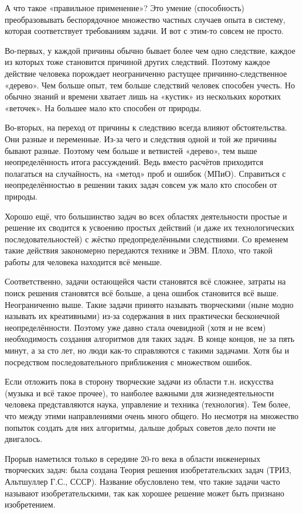 \documentclass[11pt,a4paper]{article}
\begin{document}
А что такое «правильное применение»? Это умение (способность) преобразовывать беспорядочное множество частных случаев опыта в систему, которая соответствует требованиям задачи. И вот с этим-то совсем не просто.

Во-первых, у каждой причины обычно бывает более чем одно следствие, каждое из которых тоже становится причиной других следствий. Поэтому каждое действие человека порождает неограниченно растущее причинно-следственное «дерево». Чем больше опыт, тем больше следствий человек способен учесть. Но обычно знаний и времени хватает лишь на «кустик» из нескольких коротких «веточек». На большее мало кто способен от природы.

Во-вторых, на переход от причины к следствию всегда влияют обстоятельства. Они разные и переменные. Из-за чего и следствия одной и той же причины бывают разные. Поэтому чем больше и ветвистей «дерево», тем выше неопределённость итога рассуждений. Ведь вместо расчётов приходится полагаться на случайность, на «метод» проб и ошибок (МПиО). Справиться с неопределённостью в решении таких задач совсем уж мало кто способен от природы.

Хорошо ещё, что большинство задач во всех областях деятельности простые и решение их сводится к усвоению простых действий (и даже их технологических последовательностей) с жёстко предопределёнными следствиями. Со временем такие действия закономерно передаются технике и ЭВМ. Плохо, что такой работы для человека находится всё меньше.

Соответственно, задачи остающейся части становятся всё сложнее, затраты на поиск решения становятся всё больше, а цена ошибок становится всё выше. Неограниченно выше. Такие задачи принято называть творческими (ныне модно называть их креативными) из-за содержания в них практически бесконечной неопределённости. Поэтому уже давно стала очевидной (хотя и не всем) необходимость создания алгоритмов для таких задач. В конце концов, не за пять минут, а за сто лет, но люди как-то справляются с такими задачами. Хотя бы и посредством последовательного приближения с множеством ошибок.

Если отложить пока в сторону творческие задачи из области т.н. искусства (музыка и всё такое прочее), то наиболее важными для жизнедеятельности человека представляются наука, управление и техника (технология). Тем более, что между этими направлениями очень много общего. Но несмотря на множество попыток создать для них алгоритмы, дальше добрых советов дело почти не двигалось.

Прорыв наметился только в середине 20-го века в области инженерных творческих задач: была создана Теория решения изобретательских задач (ТРИЗ, Альтшуллер Г.С., СССР). Название обусловлено тем, что такие задачи часто называют изобретательскими, так как хорошее решение может быть признано изобретением.
\end{document}
